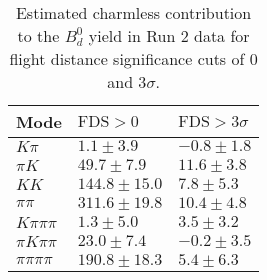 \begin{table}
  \centering
  \begin{tabular}{lll}
      \toprule
      Mode & $\mathrm{FDS} > 0$ & $\mathrm{FDS} > 3\sigma$ \\
      \midrule
      $K\pi$ & $1.1 \pm 3.9$ & $-0.8 \pm 1.8$ \\
      $\pi K$ & $49.7 \pm 7.9$ & $11.6 \pm 3.8$ \\
      $KK$ & $144.8 \pm 15.0$ & $7.8 \pm 5.3$ \\
      $\pi\pi$ & $311.6 \pm 19.8$ & $10.4 \pm 4.8$ \\
      $K\pi\pi\pi$ & $1.3 \pm 5.0$ & $3.5 \pm 3.2$ \\
      $\pi K\pi\pi$ & $23.0 \pm 7.4$ & $-0.2 \pm 3.5$ \\
      $\pi\pi\pi\pi$ & $190.8 \pm 18.3$ & $5.4 \pm 6.3$ \\
      \bottomrule
  \end{tabular}
  \caption{\small Estimated charmless contribution to the $B^{0}_{d}$ yield in Run 2 data for flight distance significance cuts of 0  and $3\sigma$.}
\label{tab:charmless_yields_Bd_run_2}
\end{table}
